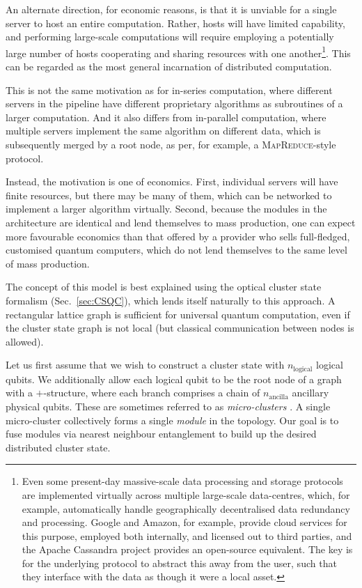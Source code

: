 \documentclass[aps, rmp, twocolumn, amsmath, amssymb, nofootinbib, superscriptaddress, longbibliography, floatfix, table-of-contents, eqsecnum]{revtex4-1}
\begin{document}
An alternate direction, for economic reasons, is that it is unviable for a single server to host an entire computation. Rather, hosts will have limited capability, and performing large-scale computations will require employing a potentially large number of hosts cooperating and sharing resources with one another\footnote{Even some present-day massive-scale data processing and storage protocols are implemented virtually across multiple large-scale data-centres, which, for example, automatically handle geographically decentralised data redundancy and processing. Google and Amazon, for example, provide cloud services for this purpose, employed both internally, and licensed out to third parties, and the Apache Cassandra project provides an open-source equivalent. The key is for the underlying protocol to abstract this away from the user, such that they interface with the data as though it were a local asset.}. This can be regarded as the most general incarnation of distributed computation.

This is not the same motivation as for in-series computation, where different servers in the pipeline have different proprietary algorithms as subroutines of a larger computation. And it also differs from in-parallel computation, where multiple servers implement the same algorithm on different data, which is subsequently merged by a root node, as per, for example, a \textsc{MapReduce}-style protocol.

Instead, the motivation is one of economics. First, individual servers will have finite resources, but there may be many of them, which can be networked to implement a larger algorithm virtually. Second, because the modules in the architecture are identical and lend themselves to mass production, one can expect more favourable economics than that offered by a provider who sells full-fledged, customised quantum computers, which do not lend themselves to the same level of mass production.

The concept of this model is best explained using the optical cluster state formalism (Sec.~\ref{sec:CSQC}), which lends itself naturally to this approach. A rectangular lattice graph is sufficient for universal quantum computation, even if the cluster state graph is not local (but classical communication between nodes is allowed).

Let us first assume that we wish to construct a cluster state with $n_\text{logical}$ logical qubits. We additionally allow each logical qubit to be the root node of a graph with a $+$-structure, where each branch comprises a chain of $n_\text{ancilla}$ ancillary physical qubits. These are sometimes referred to as \textit{micro-clusters} \cite{bib:Nielsen04}. A single micro-cluster collectively forms a single \textit{module} in the topology. Our goal is to fuse modules via nearest neighbour entanglement to build up the desired distributed cluster state.
\end{document}
